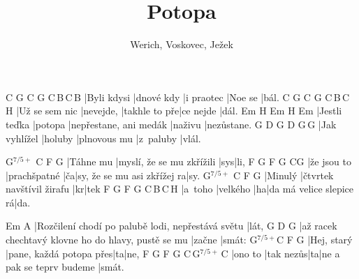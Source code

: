 \documentclass{song}
\title{Potopa}
\author{Werich, Voskovec, Ježek}
\newcommand{\aug}{$^{7/5+}$}
\begin{document}
\strophe
C           G\7        C          G\7     C\,B\7\,C\,B\7
|Byli kdysi |dnové kdy |i praotec |Noe se |bál.
C              G\7       C             G\7       C\,B\7\,C\,H\7
|Už se sem nic |nevejde, |takhle to pře|ce nejde |dál.
Em            H\7     Em                     H\7     Em
|Jestli teďka |potopa |nepřestane, ani medák |naživu |nezůstane.
G             D\7     G            D\7       G\,G\7
|Jak vyhlížel |holuby |plnovous mu |z~paluby |vlál.
\endstrophe

\strophe
{G\aug}     C                         F   G\7
|Táhne mu |myslí, že se mu zkřížili |sys|li,
F			G\7			 F	G\7						C\quad{}G\7
|že jsou to |prachšpatné |ča|sy, že se mu asi zkřížej ra|sy.
{G\aug} C                         F  G\7
|Minulý |čtvrtek navštívil žirafu |kr|tek
F       G\7      F  G\7                     C\,B\7\,C\,H\7
|a~toho |velkého |ha|da má velice slepice rá|da.
\endstrophe

\strophe
Em                                                A\7
|Rozčilení chodí po palubě lodi, nepřestává světu |lát,
G                                                   D\7    G
|až racek chechtavý klovne ho do hlavy, pustě se mu |začne |smát:
G\aug       C                       F  G\7
|Hej, starý |pane, každá potopa přes|ta|ne,
F       G\7       F  G\7                       C\,G\aug\,C
|ono to |tak nezůs|ta|ne a pak se teprv budeme |smát.
\endstrophe

\end{document}
